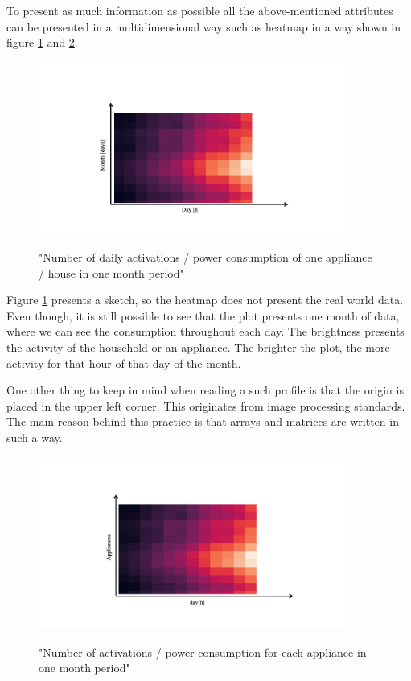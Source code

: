 To present as much information as possible all the above-mentioned attributes 
can be presented in a multidimensional way such as heatmap in a way shown in figure \ref{fig:heatmap_2dtime} and \ref{fig:heatmap_all_appl}.

\begin{figure}[H]
	\centering
	\caption{"Number of daily activations / power consumption of one appliance / house in one month period"}
	\includegraphics[width=0.9\textwidth]{Figures/profile_sketches/Slide10.png}
	\label{fig:heatmap_2dtime}
\end{figure}

Figure \ref{fig:heatmap_2dtime} presents a sketch, so the heatmap does not present the real world data. 
Even though, it is still possible to see that the plot presents one month of data, where we can see the consumption throughout each day.
The brightness presents the activity of the household or an appliance. 
The brighter the plot, the more activity for that hour of that day of the month.

One other thing to keep in mind when reading a such profile is that the origin is placed in the upper left corner.
This originates from image processing standards.
The main reason behind this practice is that arrays and matrices are written in such a way.

\begin{figure}[H]
	\centering
	\caption{"Number of activations / power consumption for each appliance in one month period"}
	\includegraphics[width=0.9\textwidth]{Figures/profile_sketches/Slide12.png}
	\label{fig:heatmap_all_appl}
\end{figure}

